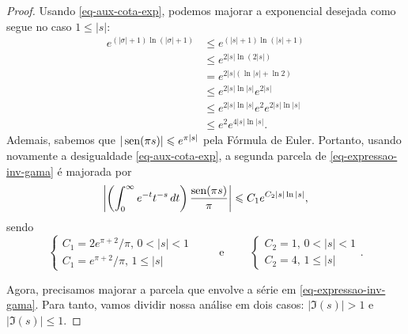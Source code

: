 \begin{proof}
        Usando \eqref{eq-aux-cota-exp}, podemos majorar a exponencial desejada como segue no caso $1\leq|s|$:
        \begin{align*}
            e^{(|\sigma|+1)\ln(|\sigma|+1)} &\leq e^{(|s|+1)\ln(|s|+1)} \\
                                            &\leq e^{2|s|\ln(2|s|)} \\
                                            &= e^{2|s|(\ln|s| + \ln 2)} \\
                                            &\leq e^{2|s|\ln|s|}e^{2|s|} \\
                                            &\leq e^{2|s|\ln|s|}e^2e^{2|s|\ln|s|} \\
                                            &\leq e^2e^{4|s|\ln|s|}.
        \end{align*}
        Ademais, sabemos que $|\operatorname{sen}(\pi s)| \leqslant e^{\pi |s|}$ pela Fórmula de Euler. Portanto,
        usando novamente a desigualdade \eqref{eq-aux-cota-exp},
        a segunda parcela de \eqref{eq-expressao-inv-gama} é majorada por
        \begin{equation}
            \left| \left( \int_0^{\infty} e^{-t}t^{-s} \, dt \right)\frac{\operatorname{sen}(\pi s)}{\pi} \right|
            \leqslant
            C_1e^{C_2|s|\ln|s|},
        \end{equation}
        sendo
        \[
        \begin{cases}
            C_1 = 2e^{\pi + 2}/\pi, \, 0 < |s| < 1 \\
            C_1 = e^{\pi + 2}/\pi, \, 1\leq |s|
        \end{cases} \qquad \text{ e } \qquad
        \begin{cases}
            C_2 = 1, \, 0 < |s| < 1 \\
            C_2 = 4, \, 1\leq |s|
        \end{cases}.
        \]
        
        Agora, precisamos majorar a parcela que envolve a série em \eqref{eq-expressao-inv-gama}.
        Para tanto, vamos dividir nossa análise em dois casos: $|\Im(s)| > 1$ e $|\Im(s)|\leq 1$.
        

\end{proof}

